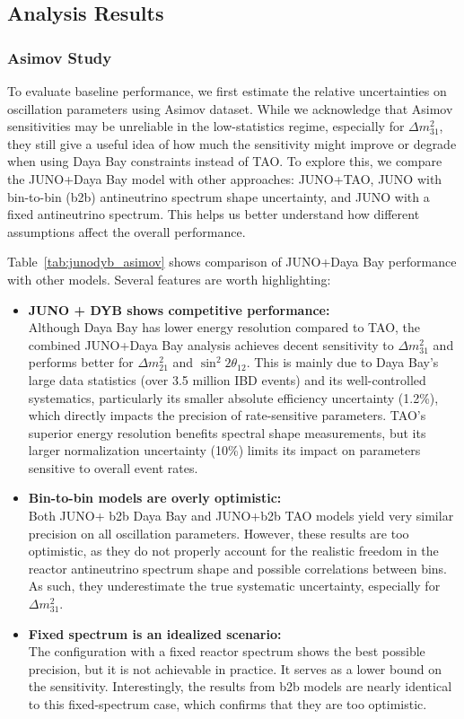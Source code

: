 \subsection{Analysis Results}

\subsubsection{Asimov Study}
To evaluate baseline performance, we first estimate the relative uncertainties on oscillation
parameters using Asimov dataset. While we acknowledge that Asimov sensitivities may be unreliable in the low-statistics regime, especially for $\Delta m^2_{31}$, they still give a useful idea of how much the sensitivity might improve or degrade when using Daya Bay constraints instead of TAO. To explore this, we compare the JUNO+Daya Bay model with other approaches: JUNO+TAO, JUNO with bin-to-bin (b2b) antineutrino spectrum shape uncertainty, and JUNO with a fixed antineutrino spectrum. This helps us better understand how different assumptions affect the overall performance.

Table~\ref{tab:junodyb_asimov} shows comparison of JUNO+Daya Bay performance with other models.
Several features are worth highlighting:
\begin{itemize}
  \item \textbf{JUNO + DYB shows competitive performance:} \\
    Although Daya Bay has lower energy resolution compared to TAO, the combined JUNO+Daya Bay
    analysis achieves decent sensitivity to $\Delta m^2_{31}$ and performs better for $\Delta
    m^2_{21}$ and $\sin^2 2\theta_{12}$. This is mainly due to Daya Bay’s large data statistics
    (over 3.5 million IBD events) and its well-controlled systematics, particularly its smaller absolute efficiency uncertainty (1.2\%), which directly impacts the precision of rate-sensitive parameters. TAO’s superior energy resolution benefits spectral shape measurements, but its larger normalization uncertainty (10\%) limits its impact on parameters sensitive to overall event rates.

  \item \textbf{Bin-to-bin models are overly optimistic:} \\
    Both JUNO+ b2b Daya Bay and JUNO+b2b TAO models yield very similar precision on all oscillation
    parameters. However, these results are too optimistic, as they do not properly account for the
    realistic freedom in the reactor antineutrino spectrum shape and possible correlations between
    bins. As such, they underestimate the true systematic uncertainty, especially for $\Delta
    m^2_{31}$.

  \item \textbf{Fixed spectrum is an idealized scenario:} \\
    The configuration with a fixed reactor spectrum shows the best possible precision, but it is not
    achievable in practice. It serves as a lower bound on the sensitivity. Interestingly, the
    results from b2b models are nearly identical to this fixed-spectrum case, which confirms that
    they are too optimistic.
\end{itemize}

